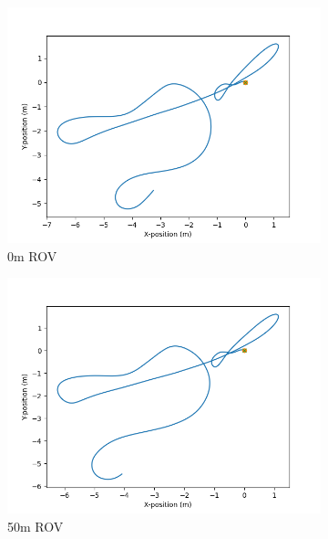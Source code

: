 \documentclass[class=article, crop=false]{standalone}
\begin{document}
\begin{figure}
    \centering
    \begin{subfigure}{0.7\textwidth}
        \centering
        \includegraphics{scenario1/rov-0m/0.5m/usv_position_controlled}
        \caption{0m ROV}
    \end{subfigure}
    \vfill
    \begin{subfigure}{0.7\textwidth}
        \centering
        \includegraphics{scenario1/rov-50m/0.5m/usv_position_controlled}
        \caption{50m ROV}
    \end{subfigure}
    \vfill
    \begin{subfigure}{0.7\textwidth}
        \centering

\end{subfigure}
\end{figure}
\end{document}
